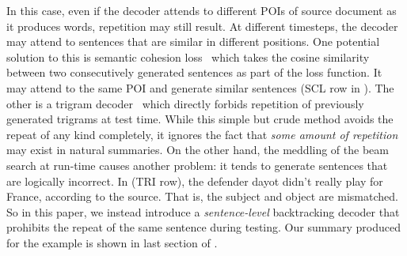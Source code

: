 In this case, even if the decoder attends to different POIs of 
source document as it produces words, repetition may still result.  
At different timesteps,
the decoder may attend 
to sentences that are similar in different positions.
One potential solution to this is semantic cohesion loss~\cite{elikyilmazBHC18}
which takes the cosine similarity between two consecutively generated sentences
as part of the loss function. It may attend to the same POI
and generate similar sentences (SCL row in ).  
The other is a trigram decoder~\cite{PaulusXS17} 
which directly forbids repetition of previously generated trigrams at test time. 
While this simple but crude method avoids the repeat of any kind
completely, 
it ignores the fact that \textit{some amount of repetition} may exist
in natural summaries.  
On the other hand, the meddling of the beam search at run-time causes another problem: 
it tends to generate sentences that are logically incorrect. 
In  (TRI row), the defender dayot didn't
really play for France, according to the source.
That is, the subject and object are mismatched.
So in this paper, we instead introduce a {\em sentence-level} backtracking decoder
that prohibits the repeat of the same sentence during testing.
Our summary produced for the example is shown in last section of 
.

%

